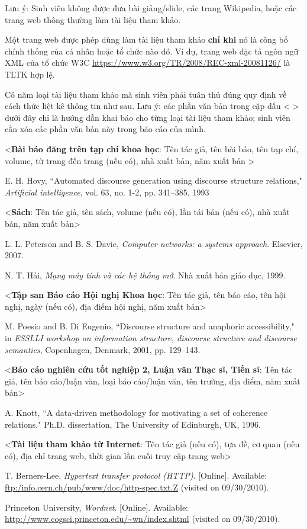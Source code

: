 \documentclass[../DoAn.tex]{subfiles}
\begin{document}
Lưu ý: Sinh viên không được đưa bài giảng/slide, các trang Wikipedia, hoặc các trang web thông thường làm tài liệu tham khảo. 

Một trang web được phép dùng làm tài liệu tham khảo \textbf{chỉ khi} nó là công bố chính thống của cá nhân hoặc tổ chức nào đó. Ví dụ, trang web đặc tả ngôn ngữ XML của tổ chức W3C \url{https://www.w3.org/TR/2008/REC-xml-20081126/} là TLTK hợp lệ.

Có năm loại tài liệu tham khảo mà sinh viên phải tuân thủ đúng quy định về cách thức liệt kê thông tin như sau. Lưu ý: các phần văn bản trong cặp dấu < > dưới đây chỉ là hướng dẫn khai báo cho từng loại tài liệu tham khảo; sinh viên cần xóa các phần văn bản này trong báo cáo của mình.

<\textbf{Bài báo đăng trên tạp chí khoa học}: Tên tác giả, tên bài báo, tên tạp chí, volume, từ trang đến trang (nếu có), nhà xuất bản, năm xuất bản >



 E. H. Hovy, ``Automated discourse generation using discourse structure relations," \textit{Artificial intelligence}, vol. 63, no. 1-2, pp. 341–385, 1993

<\textbf{Sách}: Tên tác giả, tên sách, volume (nếu có), lần tái bản (nếu có), nhà xuất bản, năm xuất bản>

	L. L. Peterson and B. S. Davie, \textit{Computer networks: a systems approach}. Elsevier, 2007.

	N. T. Hải, \textit{Mạng máy tính và các hệ thống mở}. Nhà xuất bản giáo dục, 1999. 

<\textbf{Tập san Báo cáo Hội nghị Khoa học}: Tên tác giả, tên báo cáo, tên hội nghị, ngày (nếu có), địa điểm hội nghị, năm xuất bản>

	M. Poesio and B. Di Eugenio, ``Discourse structure and anaphoric accessibility," in \textit{ESSLLI workshop on information structure, discourse structure and discourse semantics}, Copenhagen, Denmark, 2001, pp. 129–143.

<\textbf{Báo cáo nghiên cứu tốt nghiệp 2, Luận văn Thạc sĩ, Tiến sĩ}: Tên tác giả, tên báo cáo/luận văn, loại báo cáo/luận văn, tên trường, địa điểm, năm xuất bản>

	A. Knott, ``A data-driven methodology for motivating a set of coherence relations," Ph.D. dissertation, The University of Edinburgh, UK, 1996.

<\textbf{Tài liệu tham khảo từ Internet}: Tên tác giả (nếu có), tựa đề, cơ quan (nếu có), địa chỉ trang web, thời gian lần cuối truy cập trang web>

	T. Berners-Lee, \textit{Hypertext transfer protocol (HTTP)}. [Online]. Available: \url{ftp:/info.cern.ch/pub/www/doc/http-spec.txt.Z} (visited on
09/30/2010).

 Princeton University, \textit{Wordnet}. [Online]. Available: \url{http://www.cogsci.princeton.edu/~wn/index.shtml} (visited on 09/30/2010).
\end{document}
